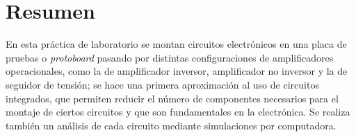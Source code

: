 \section{Resumen}

En esta práctica de laboratorio se montan circuitos electrónicos en una placa
de pruebas o \textit{protoboard} pasando por distintas configuraciones de
amplificadores operacionales, como la de amplificador inversor, amplificador no
inversor y la de seguidor de tensión; se hace una primera aproximación 
al uso de circuitos integrados, que permiten reducir el número de componentes
necesarios para el montaje de ciertos circuitos y que son fundamentales en la
electrónica. Se realiza también un análisis de cada circuito mediante
simulaciones por computadora.

